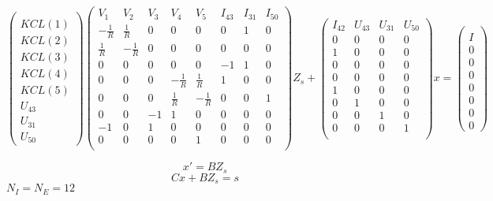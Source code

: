 \documentclass[10pt]{article}
\begin{document}
\[\left(\begin{array}{c}
\\KCL(1)\\KCL(2)\\KCL(3)\\KCL(4)\\KCL(5)\\U_{43}\\U_{31}\\U_{50}
\end{array}\right)
\left(\begin{array}{cccccccc}
  V_{1}&V_{2}&V_{3}&V_{4}&V_{5}&I_{43}&I_{31}&I_{50}\\
  \hline
  -\frac{1}{R}&\frac{1}{R}&0&0&0&0&1&0\\
  \frac{1}{R}&-\frac{1}{R}&0&0&0&0&0&0\\
  0&0&0&0&0&-1&1&0\\
  0&0&0&-\frac{1}{R}&\frac{1}{R}&1&0&0\\
  0&0&0&\frac{1}{R}&-\frac{1}{R}&0&0&1\\
  0&0&-1&1&0&0&0&0\\
  -1&0&1&0&0&0&0&0\\
  0&0&0&0&1&0&0&0\\
\end{array}\right)Z_{s}+
\left(\begin{array}{cccc}
  I_{42}&U_{43}&U_{31}&U_{50}\\
  \hline
  0&0&0&0\\
  1&0&0&0\\
  0&0&0&0\\
  0&0&0&0\\
  1&0&0&0\\
  0&1&0&0\\
  0&0&1&0\\
  0&0&0&1\\
\end{array}\right)x=
\left(\begin{array}{c}
  \\ I\\  0\\  0\\  0\\  0\\  0\\  0\\  0
  \end{array}\right)
\]

\[x'=BZ_{s}\]
\[Cx+BZ_{s}=s\]
$N_{I}=N_{E}=12$
\end{document}
